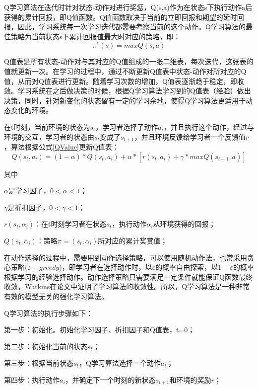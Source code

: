 Q学习算法在迭代时针对状态-动作对进行奖惩，Q(s,a)作为在状态s下执行动作a后获得的累计回报，即Q值函数。Q值函数取决于当前的立即回报和期望的延时回报，因此，学习系统每一次学习迭代都需要考察当前的这个动作。Q学习算法的最佳策略为当前状态s下累计回报值最大时对应的策略，即：
\begin{equation}
    \pi^*(s) = max Q(s,a)
\end{equation}

Q值表是所有状态-动作对与其对应的Q值组成的一张二维表，每次迭代，这张表的值就更新一次。在学习的过程中，通过不断更新Q值表中状态-动作对所对应的Q值，从而对Q值表进行更新。随着学习次数的增加，Q值表逐渐趋于稳定，即收敛。学习系统在之后做决策的时候，根据Q学习算法学习到的Q值表（经验）做出决策，同时，针对新变化的状态留有一定的学习余地，使得Q学习算法更适用于动态变化的环境。

在t时刻，当前环境的状态为$s_t$，学习者选择了动作$a_i$，并且执行这个动作，经过与环境的交互，学习者的状态由$s_t$变成了$s_{t+1}$，并且环境反馈给学习者一个反馈值$r$，算法根据公式\ref{QValue}\cite{RLIntroduction}更新Q值表：
\begin{equation}
    \label{QValue}
    Q(s_t,a_i)=(1-\alpha)*Q(s_t,a_i)+\alpha *[r(s_t,a_i)+\gamma *maxQ(s_{t+1},a)]
\end{equation}

其中

$\alpha$是学习因子，$0<\alpha <1$；

$\gamma$是折扣因子，$0<\gamma <1$；

$r(s_t,\alpha_i)$：在t时刻学习者在状态$s_t$，执行动作$\alpha_i$从环境获得的回报；

$Q(s_t,\alpha_i)$：策略$\pi=(s_t,\alpha_i)$所对应的累计奖赏值；

在动作选择的过程中，需要用到动作选择策略，可以使用随机动作法，也常采用贪心策略($\varepsilon-greedy$)，即学习者在选择动作时，以$\varepsilon$的概率自由探索，以$1-\varepsilon$的概率根据学习的经验选择动作。动作选择策略只需要满足一定条件就能保证Q函数最终收敛，Watkins在论文\cite{QLearning3}中证明了学习算法的收敛性。所以，Q学习算法是一种非常有效的模型无关的强化学习算法。

Q学习算法的执行步骤如下：

第一步：初始化。初始化学习因子、折扣因子和Q值表，t=0；

第二步：初始化当前的状态$s_t$；

第三步：根据当前状态$s_t$，Q学习算法选择一个动作$a_i$；

第四步：执行动作$a_i$，并确定下一个时刻的新状态$s_{t+1}$和环境的奖励$r$；

